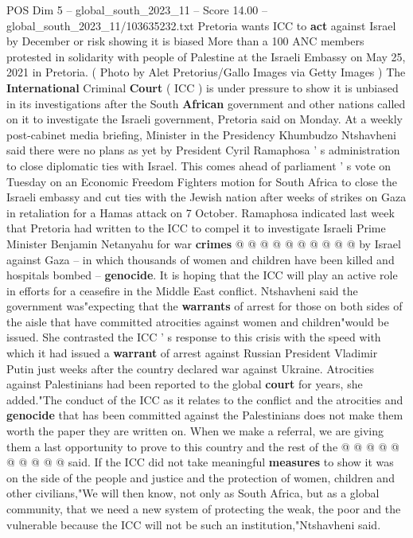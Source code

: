 \begin{textsample}{POS Dim 5 – global\_south\_2023\_11 – Score 14.00 – global\_south\_2023\_11/103635232.txt}  \label{ex:f5_pos_252}
Pretoria wants ICC to \textbf{act} against Israel by December or risk showing it is biased More than a 100 ANC members protested in solidarity with people of Palestine at the Israeli Embassy on May 25, 2021 in Pretoria. ( Photo by Alet Pretorius/Gallo Images via Getty Images ) The \textbf{International} Criminal \textbf{Court} ( ICC ) is under pressure to show it is unbiased in its investigations after the South \textbf{African} government and other nations called on it to investigate the Israeli government, Pretoria said on Monday.
At a weekly post-cabinet media briefing, Minister in the Presidency Khumbudzo Ntshavheni said there were no plans as yet by President Cyril Ramaphosa ' s administration to close diplomatic ties with Israel.
This comes ahead of parliament ' s vote on Tuesday on an Economic Freedom Fighters motion for South Africa to close the Israeli embassy and cut ties with the Jewish nation after weeks of strikes on Gaza in retaliation for a Hamas attack on 7 October.
Ramaphosa indicated last week that Pretoria had written to the ICC to compel it to investigate Israeli Prime Minister Benjamin Netanyahu for war \textbf{crimes} @ @ @ @ @ @ @ @ @ @ by Israel against Gaza -- in which thousands of women and children have been killed and hospitals bombed -- \textbf{genocide}.
It is hoping that the ICC will play an active role in efforts for a ceasefire in the Middle East conflict.
Ntshavheni said the government was"expecting that the \textbf{warrants} of arrest for those on both sides of the aisle that have committed atrocities against women and children"would be issued.
She contrasted the ICC ' s response to this crisis with the speed with which it had issued a \textbf{warrant} of arrest against Russian President Vladimir Putin just weeks after the country declared war against Ukraine.
Atrocities against Palestinians had been reported to the global \textbf{court} for years, she added."The conduct of the ICC as it relates to the conflict and the atrocities and \textbf{genocide} that has been committed against the Palestinians does not make them worth the paper they are written on.
When we make a referral, we are giving them a last opportunity to prove to this country and the rest of the @ @ @ @ @ @ @ @ @ @ said.
If the ICC did not take meaningful \textbf{measures} to show it was on the side of the people and justice and the protection of women, children and other civilians,"We will then know, not only as South Africa, but as a global community, that we need a new system of protecting the weak, the poor and the vulnerable because the ICC will not be such an institution,"Ntshavheni said.

\end{textsample}
